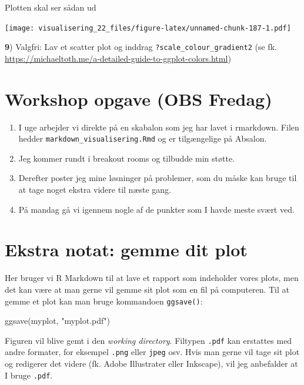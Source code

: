 \documentclass[
]{book}
\newenvironment{Shaded}{\begin{snugshade}}{\end{snugshade}}
\newcommand{\FunctionTok}[1]{\textcolor[rgb]{0.00,0.00,0.00}{#1}}
\newcommand{\NormalTok}[1]{#1}
\newcommand{\StringTok}[1]{\textcolor[rgb]{0.31,0.60,0.02}{#1}}
\begin{document}
Plotten skal ser sådan ud

\texttt{[image: visualisering\_22\_files/figure-latex/unnamed-chunk-187-1.pdf]}

\textbf{9}) Valgfri: Lav et scatter plot og inddrag \texttt{?scale\_colour\_gradient2} (se fk. \url{https://michaeltoth.me/a-detailed-guide-to-ggplot-colors.html})

\hypertarget{workshop-opgave-obs-fredag}{%
\section{Workshop opgave (OBS Fredag)}\label{workshop-opgave-obs-fredag}}

\begin{enumerate}
\def\labelenumi{\arabic{enumi})}
\item
  I uge arbejder vi direkte på en skabalon som jeg har lavet i rmarkdown. Filen hedder \texttt{markdown\_visualisering.Rmd} og er tilgængelige på Absalon.
\item
  Jeg kommer rundt i breakout rooms og tilbudde min støtte.
\item
  Derefter poster jeg mine løsninger på problemer, som du måske kan bruge til at tage noget ekstra videre til næste gang.
\item
  På mandag gå vi igennem nogle af de punkter som I havde meste svært ved.
\end{enumerate}

\hypertarget{ekstra-notat-gemme-dit-plot}{%
\section{Ekstra notat: gemme dit plot}\label{ekstra-notat-gemme-dit-plot}}

Her bruger vi R Markdown til at lave et rapport som indeholder vores plots, men det kan være at man gerne vil gemme sit plot som en fil på computeren. Til at gemme et plot kan man bruge kommandoen \texttt{ggsave()}:

\begin{Shaded}
\begin{Highlighting}[]
\FunctionTok{ggsave}\NormalTok{(myplot, }\StringTok{"myplot.pdf"}\NormalTok{)}
\end{Highlighting}
\end{Shaded}

Figuren vil blive gemt i den \emph{working directory}. Filtypen \texttt{.pdf} kan erstattes med andre formater, for eksempel \texttt{.png} eller \texttt{jpeg} osv. Hvis man gerne vil tage sit plot og redigerer det videre (fk. Adobe Illustrater eller Inkscape), vil jeg anbefalder at I bruge \texttt{.pdf}.
\end{document}
